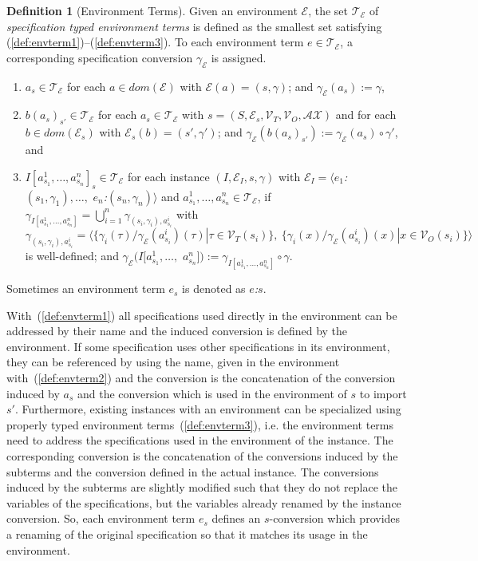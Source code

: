 \documentclass{article}
\theoremstyle{remark}
\theoremstyle{definition}
\newtheorem{definition}[theorem]{Definition}
\newcommand{\vars}{\mathcal{V}}
\newcommand{\terms}{\mathcal{T}}
\newcommand{\env}{\mathcal{E}}
\newcommand{\envterms}{\terms_\env}
\newcommand{\dom}{\mathit{dom}}
\newcommand{\Ax}{\mathcal{AX}}
\begin{document}
\begin{definition}[Environment Terms]
Given an environment $\env$, the set $\envterms$ of \emph{specification typed environment terms} is defined as the
smallest set satisfying (\ref{def:envterm1})--(\ref{def:envterm3}). To each environment term $e\in\envterms$, a
corresponding specification conversion $\gamma_\env$ is assigned.
\begin{enumerate}
 \item \label{def:envterm1} $a_s\in\envterms$ for each $a\in \dom(\env)$ with $\env(a)=(s,\gamma)$; and
 $\gamma_\env(a_s) := \gamma$,
 \item \label{def:envterm2} $b(a_s)_{s'}\in\envterms$ for each $a_s\in \envterms$ with $s=(S, \env_s, \vars_T, \vars_O, \Ax)$
  and for each $b\in \dom(\env_s)$ with $\env_s(b)=(s',\gamma')$; and $\gamma_\env(b(a_s)_{s'}) :=
  \gamma_\env(a_s) \circ \gamma'$, and
 \item \label{def:envterm3} ${I[a^1_{s_1},\ldots,a^n_{s_n}]}_s\in \envterms$ for each instance $(I,\env_I,s,\gamma)$ with
   $\env_I = \langle e_1$\emph{:}$(s_1,\gamma_1),\ldots,$ $e_n$\emph{:}$(s_n,\gamma_n) \rangle$ and $a^1_{s_1},\ldots,a^n_{s_n}\in\envterms$, if
   $\gamma_{I[a^1_{s_1},\ldots,a^n_{s_n}]} = \bigcup_{i=1}^n \gamma_{(s_i,\gamma_i),a^i_{s_i}}$ with
   $\gamma_{(s_i,\gamma_i),a^i_{s_i}} =
   \langle \{ \gamma_i(\tau) / \gamma_\env(a^i_{s_i})(\tau) | \tau\in  \vars_T(s_i) \} ,\
   \{ \gamma_i(x) / \gamma_\env(a^i_{s_i})(x) | x\in \vars_O(s_i) \} \rangle$
   is well-defined; and $\gamma_\env(I[a^1_{s_1},\ldots,$ $a^n_{s_n}]) := \gamma_{I[a^1_{s_1},\ldots,a^n_{s_n}]} \circ
   \gamma$.
\end{enumerate}
Sometimes an environment term $e_s$ is denoted as $e$\emph{:}$s$.
\end{definition}

With~(\ref{def:envterm1}) all specifications used directly in the environment can be addressed by their name and the
induced conversion is defined by the environment. If some specification uses other specifications in its environment,
they can be referenced by using the name, given in the environment with~(\ref{def:envterm2}) and the conversion is the
concatenation of the conversion induced by $a_s$ and the conversion which is used in the environment of $s$ to import
$s'$. Furthermore, existing instances with an environment can be specialized using properly typed environment
terms~(\ref{def:envterm3}), i.e. the environment terms need to address the specifications used in the environment of
the instance. The corresponding conversion is the concatenation of the conversions induced by the subterms and the
conversion defined in the actual instance. The conversions induced by the subterms are slightly modified such that they
do not replace the variables of the specifications, but the variables already renamed by the instance conversion. So,
each environment term $e_s$ defines an $s$-conversion which provides a renaming of the original specification so that
it matches its usage in the environment.
\end{document}
